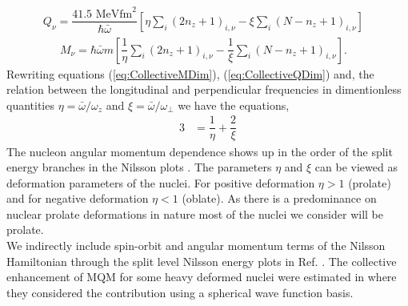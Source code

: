 \documentclass[10pt,a4paper, twoside, openright]{report}
\begin{document}
\begin{align}
Q_{\nu} = \dfrac{41.5\text{ MeV}\text{fm}^2}{\hbar\bar{\omega}}\left[\eta\sum_{i}\left(2n_z + 1\right)_{i,\nu}  - \xi\sum_{i}\left(N - n_z + 1\right)_{i,\nu}\right]&
\label{eq:QDimensionless}
\end{align}
\begin{align}
M_{\nu} = \hbar\bar{\omega}m\left[\dfrac{1}{\eta}\sum_{i}\left(2n_z + 1\right)_{i,\nu} - \dfrac{1}{\xi}\sum_{i}\left(N - n_z + 1\right)_{i,\nu}\right]. & \label{eq:MDimensionless}
\end{align}
Rewriting equations (\ref{eq:CollectiveMDim}), (\ref{eq:CollectiveQDim})  and, the relation between the longitudinal  and perpendicular frequencies in dimentionless quantities $\eta = \bar{\omega}/\omega_z$ and $\xi = \bar{\omega}/\omega_{\perp}$ we have the equations,
\begin{align}
3 &= \dfrac{1}{\eta} + \dfrac{2}{\xi} \label{eq:average} 
\end{align}
The nucleon angular momentum dependence shows up in the order of the split energy branches in the Nilsson plots \cite{Nilsson1955, BohrMottVol2}.
The parameters $\eta$ and $\xi$ can be viewed as deformation parameters of the nuclei. For positive deformation $\eta > 1$ (prolate) and for negative deformation $\eta < 1$ (oblate). As there is a predominance on nuclear prolate deformations in nature most of the nuclei we consider will be prolate. \\
\linebreak
We indirectly include spin-orbit and angular momentum terms of the Nilsson Hamiltonian through the split level Nilsson energy plots in Ref. \cite{BohrMottVol2}.
The collective enhancement of MQM for some  heavy deformed nuclei were estimated in \cite{Flambaum1994, Flambaum2014} where they considered the contribution using a spherical wave function basis. 
\end{document}
